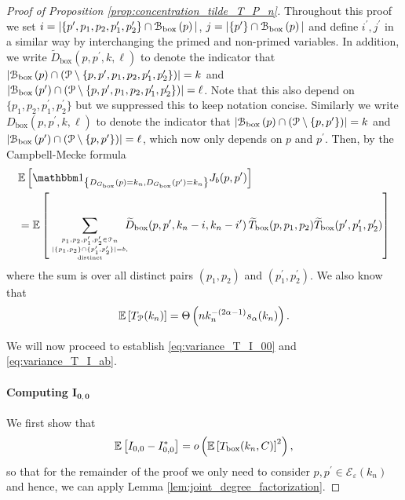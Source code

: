 \begin{proof}[Proof of Proposition \ref{prop:concentration_tilde_T_P_n}]

Throughout this proof we set $i = |\{p^\prime, p_1, p_2, p_1^\prime, p_2^\prime\} \cap {\mathcal B}_{\text{box}}\left(p\right)|$, $j = |\{p^\prime\} \cap {\mathcal B}_{\text{box}}\left(p\right)|$ and define $i^\prime, j^\prime$ in a similar way by interchanging the primed and non-primed variables. In addition, we write $\widetilde{D}_{\text{box}}(p,p^\prime,k,\ell)$ to denote the indicator that $|{\mathcal B}_{\text{box}}\left(p\right) \cap ({\mathcal P} \setminus \{p, p^\prime, p_1, p_2, p_1^\prime, p_2^\prime\})| = k$ and $|{\mathcal B}_{\text{box}}\left(p^\prime\right) \cap ({\mathcal P} \setminus \{p, p^\prime, p_1, p_2, p_1^\prime, p_2^\prime\})| = \ell$. Note that this also depend on $\{p_1, p_2, p_1^\prime, p_2^\prime\}$ but we suppressed this to keep notation concise. Similarly we write $D_{\text{box}}(p,p^\prime,k,\ell)$ to denote the indicator that $|{\mathcal B}_{\text{box}}\left(p\right) \cap ({\mathcal P} \setminus \{p, p^\prime\})| = k$ and $|{\mathcal B}_{\text{box}}\left(p^\prime\right) \cap ({\mathcal P} \setminus \{p, p^\prime\})| = \ell$, which now only depends on $p$ and $p^\prime$. Then, by the Campbell-Mecke formula
\begin{align*}
	&\Exp{\ind{\Dbox(p) = k_n, \Dbox(p^\prime) = k_n} J_b(p,p^\prime)}\\
	&= \Exp{\sum_{{p_1, p_2, p_1^\prime, p_2^\prime \in \Pcal_n 
		\atop |\{p_1, p_2\} \cap \{p_1^\prime, p_2^\prime\}| = b,} \atop \text{distinct}}
			\hspace{-7pt} \widetilde{D}_{\text{box}}(p,p^\prime, k_n-i,k_n- i^\prime) \,
			\widetilde{T}_{\text{box}}(p,p_1,p_2) \widetilde{T}_{\text{box}}(p^\prime, p_1^\prime, p_2^\prime)}
\end{align*}
where the sum is over all distinct pairs $(p_1, p_2)$ and $(p_1^\prime, p_2^\prime)$. We also know that 
\[
	\mathbb{E}\left[T_{{\mathcal P}}(k_n)\right] = \Theta\left(n k_n^{-(2\alpha - 1)} s_\alpha(k_n)\right).
\]

We will now proceed to establish \eqref{eq:variance_T_I_00} and \eqref{eq:variance_T_I_ab}. 

\paragraph{Computing $\bm{I_{0,0}}$}
We first show that
\begin{equation}\label{eq:I_ab_ast_main}
	\mathbb{E}\left[I_{0,0} - I_{0,0}^\ast\right] = o\left(\mathbb{E}\left[T_{\text{box}}(k_n,C)\right]^2\right),
\end{equation}
so that for the remainder of the proof we only need to consider $p, p^\prime \in \mathcal{E}_\varepsilon(k_n)$ and hence, we can apply Lemma \ref{lem:joint_degree_factorization}. 


\end{proof}
